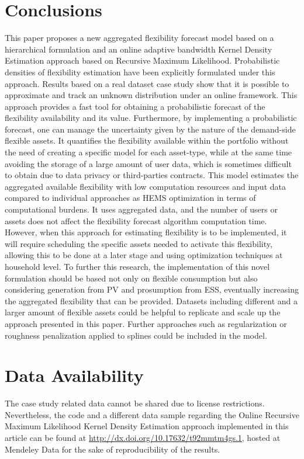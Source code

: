 \section{Conclusions} \label{Sect:Conclusions}
This paper proposes a new aggregated flexibility forecast model based on a hierarchical formulation and an online adaptive bandwidth Kernel Density Estimation approach based on Recursive Maximum Likelihood. Probabilistic densities of flexibility estimation have been explicitly formulated under this approach. Results based on a real dataset case study show that it is possible to approximate and track an unknown distribution under an online framework. This approach provides a fast tool for obtaining a probabilistic forecast of the flexibility availability and its value. Furthermore, by implementing a probabilistic forecast, one can manage the uncertainty given by the nature of the demand-side flexible assets. 
It quantifies the flexibility available within the portfolio without the need of creating a specific model for each asset-type, while at the same time avoiding the storage of a large amount of user data, which is sometimes difficult to obtain due to data privacy or third-parties contracts. 
This model estimates the aggregated available flexibility with low computation resources and input data compared to individual approaches as HEMS optimization in terms of computational burdens. It uses aggregated data, and the number of users or assets does not affect the flexibility forecast algorithm computation time. However, when this approach for estimating flexibility is to be implemented, it will require scheduling the specific assets needed to activate this flexibility, allowing this to be done at a later stage and using optimization techniques at household level. To further this research, the implementation of this novel formulation should be based not only on flexible consumption but also considering generation from PV and prosumption from ESS, eventually increasing the aggregated flexibility that can be provided. Datasets including different and a larger amount of flexible assets could be helpful to replicate and scale up the approach presented in this paper. Further approaches such as regularization or roughness penalization applied to splines could be included in the model.

\section{Data Availability}
The case study related data cannot be shared due to license restrictions. Nevertheless, the code and a different data sample regarding the Online Recursive Maximum Likelihood Kernel Density Estimation approach implemented in this article can be found at \url{http://dx.doi.org/10.17632/t92mmtm4gs.1}, hosted at Mendeley Data \cite{Munne-collado_dataset} for the sake of reproducibility of the results.
